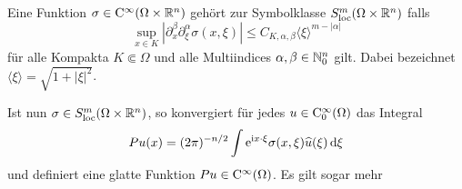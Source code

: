 \begin{df}
Eine Funktion $\sigma\in\mathrm C^\infty(\Omega\times\mathbb R^n)$ gehört zur Symbolklasse $S^m_{\rm loc}(\Omega\times\mathbb R^n)$ falls
\begin{equation} 
  \sup_{x\in K}  |  \partial_x^\beta\partial_\xi^\alpha \sigma(x,\xi) | \le C_{K,\alpha,\beta} \langle\xi\rangle^{m-|\alpha|}
\end{equation}
für alle Kompakta $K\Subset\Omega$ und alle Multiindices $\alpha,\beta\in\mathbb N^n_0$ gilt. Dabei bezeichnet $\langle\xi\rangle = \sqrt{1+|\xi|^2}$.
\end{df}

Ist nun $\sigma\in S^m_{\rm loc}(\Omega\times\mathbb R^n)$, so konvergiert für jedes $u\in\mathrm C_0^\infty(\Omega)$ das Integral
\begin{equation}\label{eq:6:6.9}
   P u (x) = (2\pi)^{-n/2} \int \mathrm e^{\mathrm i x\cdot\xi} \sigma(x,\xi) \widehat u(\xi) \,\mathrm d\xi
\end{equation}
und definiert eine glatte Funktion $Pu\in\mathrm C^\infty(\Omega)$. Es gilt sogar mehr

